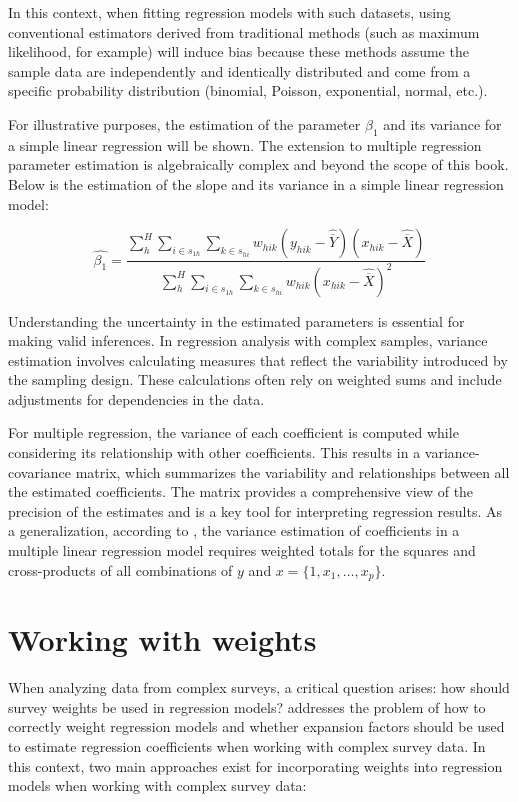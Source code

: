 \documentclass[
  12pt,
]{book}
\begin{document}
In this context, when fitting regression models with such datasets, using conventional estimators derived from traditional methods (such as maximum likelihood, for example) will induce bias because these methods assume the sample data are independently and identically distributed and come from a specific probability distribution (binomial, Poisson, exponential, normal, etc.).

For illustrative purposes, the estimation of the parameter \(\beta_{1}\) and its variance for a simple linear regression will be shown. The extension to multiple regression parameter estimation is algebraically complex and beyond the scope of this book. Below is the estimation of the slope and its variance in a simple linear regression model:

\[
\widehat{\beta_{1}} = \frac{\sum_{h}^{H} \sum_{i \in s_{1h}}\sum_{k \in s_{hi}} w_{h i k} \left(y_{h i k} - \widehat{\overline{Y}} \right) \left(x_{h i k} - \widehat{\overline{X}} \right)} {\sum_{h}^{H} \sum_{i \in s_{1h}}\sum_{k \in s_{hi}} w_{h i k} \left(x_{h i k} - \widehat{\overline{X}} \right)^{2}}
\]

Understanding the uncertainty in the estimated parameters is essential for making valid inferences. In regression analysis with complex samples, variance estimation involves calculating measures that reflect the variability introduced by the sampling design. These calculations often rely on weighted sums and include adjustments for dependencies in the data.

For multiple regression, the variance of each coefficient is computed while considering its relationship with other coefficients. This results in a variance-covariance matrix, which summarizes the variability and relationships between all the estimated coefficients. The matrix provides a comprehensive view of the precision of the estimates and is a key tool for interpreting regression results. As a generalization, according to \citet{kish1974inference}, the variance estimation of coefficients in a multiple linear regression model requires weighted totals for the squares and cross-products of all combinations of \(y\) and \(x = \{1, x_{1}, \ldots, x_{p}\}\).

\hypertarget{working-with-weights}{%
\section{Working with weights}\label{working-with-weights}}

When analyzing data from complex surveys, a critical question arises: how should survey weights be used in regression models? \citet{Heeringa_West_Berglund_2017} addresses the problem of how to correctly weight regression models and whether expansion factors should be used to estimate regression coefficients when working with complex survey data. In this context, two main approaches exist for incorporating weights into regression models when working with complex survey data:
\end{document}
